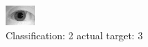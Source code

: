 \begin{figure}[h!]
\begin{center}
\includegraphics[width=0.60\columnwidth]{figures/ID1069_class_2_target_3.png}
\end{center}
\caption{ Classification: 2 actual target: 3}
\label{fig:ID1069_class_2_target_3}
\end{figure}
